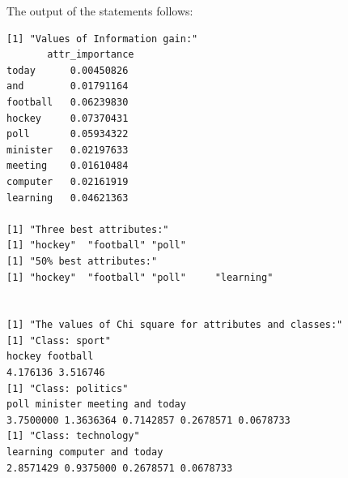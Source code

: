 The output of the statements follows:\\[0pt]
\begin{verbatim}
[1] "Values of Information gain:"
       attr_importance
today      0.00450826
and        0.01791164
football   0.06239830
hockey     0.07370431
poll       0.05934322
minister   0.02197633
meeting    0.01610484
computer   0.02161919
learning   0.04621363

[1] "Three best attributes:"
[1] "hockey"  "football" "poll"
[1] "50% best attributes:"
[1] "hockey"  "football" "poll"     "learning"


[1] "The values of Chi square for attributes and classes:"
[1] "Class: sport"
hockey football
4.176136 3.516746
[1] "Class: politics"
poll minister meeting and today
3.7500000 1.3636364 0.7142857 0.2678571 0.0678733
[1] "Class: technology"
learning computer and today
2.8571429 0.9375000 0.2678571 0.0678733
\end{verbatim}
